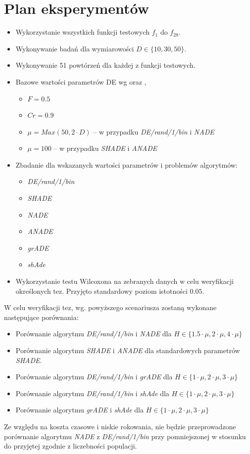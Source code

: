 \documentclass[12pt,a4paper]{report}
\begin{document}
{{{{{{{\section{Plan eksperymentów}
\par{
\begin{itemize}
\item Wykorzystanie wszystkich funkcji testowych $f_1$ do $f_{28}$.
\item Wykonywanie badań dla wymiarowości $D \in \{10, 30, 50\}$.
\item Wykonywanie 51 powtórzeń dla każdej z funkcji testowych.
\item Bazowe wartości parametrów DE wg \cite{CEC2013DEbasic} oraz \cite{SHADE},
\begin{itemize}
\item $F = 0.5$
\item $Cr = 0.9$
\item $\mu = Max(50, 2 \cdot D)$ -- w przypadku \emph{DE/rand/1/bin} i \emph{NADE}
\item $\mu = 100$ -- w przypadku \emph{SHADE} i \emph{ANADE}
\end{itemize}
\item Zbadanie dla wskazanych wartości parametrów i problemów algorytmów:
\begin{itemize}
\item \emph{DE/rand/1/bin}
\item \emph{SHADE}
\item \emph{NADE}
\item \emph{ANADE}
\item \emph{grADE}
\item \emph{shAde}
\end{itemize}

\item Wykorzystanie testu Wilcoxona na zebranych danych w celu weryfikacji określonych tez. Przyjęto standardowy poziom istotności $0.05$.
\end{itemize}
}
\par{
W celu weryfikacji tez, wg. powyższego scenariusza zostaną wykonane następujące porównania:
\begin{itemize}
\item Porównanie algorytmu \emph{DE/rand/1/bin} i \emph{NADE} dla $H \in \{1.5 \cdot \mu, 2 \cdot \mu, 4 \cdot \mu \}$
\item Porównanie algorytmu \emph{SHADE} i \emph{ANADE} dla standardowych parametrów \emph{SHADE}.
\item Porównanie algorytmu \emph{DE/rand/1/bin} i \emph{grADE} dla $H \in \{1 \cdot \mu, 2 \cdot \mu, 3 \cdot \mu \}$
\item Porównanie algorytmu \emph{DE/rand/1/bin} i \emph{shAde} dla $H \in \{1 \cdot \mu, 2 \cdot \mu, 3 \cdot \mu \}$
\item Porównanie algorytmu \emph{grADE} i \emph{shAde} dla $H \in \{1 \cdot \mu, 2 \cdot \mu, 3 \cdot \mu \}$
\end{itemize}
}
\par{
Ze względu na koszta czasowe i niskie rokowania, nie będzie przeprowadzone porównanie algorytmu \emph{NADE} z \emph{DE/rand/1/bin} przy pomniejszonej w stosunku do przyjętej zgodnie z \cite{CEC2013DEbasic} liczebności populacji.
}

}}}}}}}
\end{document}
